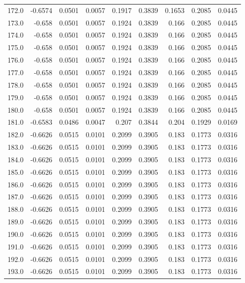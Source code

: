 \begin{longtable}{lrrrrrrrr}
172.0 & -0.6574 & 0.0501 & 0.0057 & 0.1917 & 0.3839 & 0.1653 & 0.2085 & 0.0445 \\
173.0 & -0.658 & 0.0501 & 0.0057 & 0.1924 & 0.3839 & 0.166 & 0.2085 & 0.0445 \\
174.0 & -0.658 & 0.0501 & 0.0057 & 0.1924 & 0.3839 & 0.166 & 0.2085 & 0.0445 \\
175.0 & -0.658 & 0.0501 & 0.0057 & 0.1924 & 0.3839 & 0.166 & 0.2085 & 0.0445 \\
176.0 & -0.658 & 0.0501 & 0.0057 & 0.1924 & 0.3839 & 0.166 & 0.2085 & 0.0445 \\
177.0 & -0.658 & 0.0501 & 0.0057 & 0.1924 & 0.3839 & 0.166 & 0.2085 & 0.0445 \\
178.0 & -0.658 & 0.0501 & 0.0057 & 0.1924 & 0.3839 & 0.166 & 0.2085 & 0.0445 \\
179.0 & -0.658 & 0.0501 & 0.0057 & 0.1924 & 0.3839 & 0.166 & 0.2085 & 0.0445 \\
180.0 & -0.658 & 0.0501 & 0.0057 & 0.1924 & 0.3839 & 0.166 & 0.2085 & 0.0445 \\
181.0 & -0.6583 & 0.0486 & 0.0047 & 0.207 & 0.3844 & 0.204 & 0.1929 & 0.0169 \\
182.0 & -0.6626 & 0.0515 & 0.0101 & 0.2099 & 0.3905 & 0.183 & 0.1773 & 0.0316 \\
183.0 & -0.6626 & 0.0515 & 0.0101 & 0.2099 & 0.3905 & 0.183 & 0.1773 & 0.0316 \\
184.0 & -0.6626 & 0.0515 & 0.0101 & 0.2099 & 0.3905 & 0.183 & 0.1773 & 0.0316 \\
185.0 & -0.6626 & 0.0515 & 0.0101 & 0.2099 & 0.3905 & 0.183 & 0.1773 & 0.0316 \\
186.0 & -0.6626 & 0.0515 & 0.0101 & 0.2099 & 0.3905 & 0.183 & 0.1773 & 0.0316 \\
187.0 & -0.6626 & 0.0515 & 0.0101 & 0.2099 & 0.3905 & 0.183 & 0.1773 & 0.0316 \\
188.0 & -0.6626 & 0.0515 & 0.0101 & 0.2099 & 0.3905 & 0.183 & 0.1773 & 0.0316 \\
189.0 & -0.6626 & 0.0515 & 0.0101 & 0.2099 & 0.3905 & 0.183 & 0.1773 & 0.0316 \\
190.0 & -0.6626 & 0.0515 & 0.0101 & 0.2099 & 0.3905 & 0.183 & 0.1773 & 0.0316 \\
191.0 & -0.6626 & 0.0515 & 0.0101 & 0.2099 & 0.3905 & 0.183 & 0.1773 & 0.0316 \\
192.0 & -0.6626 & 0.0515 & 0.0101 & 0.2099 & 0.3905 & 0.183 & 0.1773 & 0.0316 \\
193.0 & -0.6626 & 0.0515 & 0.0101 & 0.2099 & 0.3905 & 0.183 & 0.1773 & 0.0316 \\

\end{longtable}
